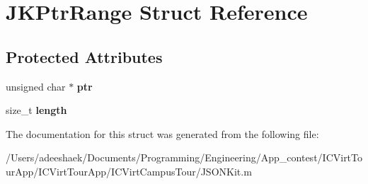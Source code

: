 \hypertarget{struct_j_k_ptr_range}{\section{J\-K\-Ptr\-Range Struct Reference}
\label{struct_j_k_ptr_range}
}
\subsection*{Protected Attributes}
\begin{DoxyCompactItemize}
\item 
\hypertarget{struct_j_k_ptr_range_a47025a27b80875ccd05b978bf7c26e76}{unsigned char $\ast$ {\bfseries ptr}}\label{struct_j_k_ptr_range_a47025a27b80875ccd05b978bf7c26e76}

\item 
\hypertarget{struct_j_k_ptr_range_ae809d5359ac030c60a30a8f0b2294b82}{size\-\_\-t {\bfseries length}}\label{struct_j_k_ptr_range_ae809d5359ac030c60a30a8f0b2294b82}

\end{DoxyCompactItemize}


The documentation for this struct was generated from the following file\-:\begin{DoxyCompactItemize}
\item 
/\-Users/adeeshaek/\-Documents/\-Programming/\-Engineering/\-App\-\_\-contest/\-I\-C\-Virt\-Tour\-App/\-I\-C\-Virt\-Tour\-App/\-I\-C\-Virt\-Campus\-Tour/J\-S\-O\-N\-Kit.\-m\end{DoxyCompactItemize}
